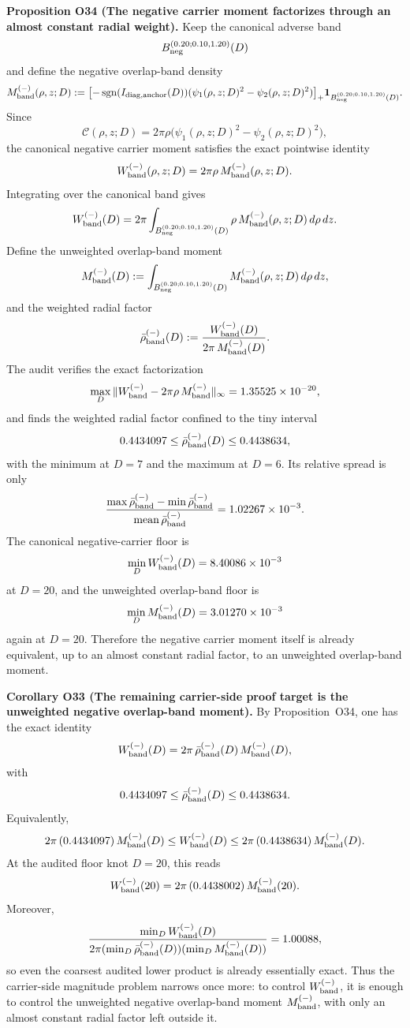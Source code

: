 \documentclass[aps,prd,onecolumn,notitlepage,nofootinbib,superscriptaddress,11pt,floatfix]{revtex4-2}
\begin{document}
\medskip\noindent\textbf{Proposition O34 (The negative carrier moment factorizes through an almost constant radial weight).}
Keep the canonical adverse band
\[
B_{\rm neg}^{(0.20;0.10,1.20)}(D)
\]
and define the negative overlap-band density
\[
M_{\rm band}^{(-)}(\rho,z;D)
:=
\bigl[-\operatorname{sgn}(I_{\rm diag,anchor}(D))(\psi_1(\rho,z;D)^2-\psi_2(\rho,z;D)^2)\bigr]_+
\mathbf 1_{B_{\rm neg}^{(0.20;0.10,1.20)}(D)}.
\]
Since
\[
\mathcal C(\rho,z;D)=2\pi\rho\bigl(\psi_1(\rho,z;D)^2-\psi_2(\rho,z;D)^2\bigr),
\]
the canonical negative carrier moment satisfies the exact pointwise identity
\[
W_{\rm band}^{(-)}(\rho,z;D)
=
2\pi\rho\,M_{\rm band}^{(-)}(\rho,z;D).
\]
Integrating over the canonical band gives
\[
W_{\rm band}^{(-)}(D)
=
2\pi\int_{B_{\rm neg}^{(0.20;0.10,1.20)}(D)} \rho\,M_{\rm band}^{(-)}(\rho,z;D)\,d\rho\,dz.
\]
Define the unweighted overlap-band moment
\[
M_{\rm band}^{(-)}(D)
:=
\int_{B_{\rm neg}^{(0.20;0.10,1.20)}(D)}
M_{\rm band}^{(-)}(\rho,z;D)\,d\rho\,dz,
\]
and the weighted radial factor
\[
\bar\rho_{\rm band}^{(-)}(D)
:=
\frac{W_{\rm band}^{(-)}(D)}{2\pi\,M_{\rm band}^{(-)}(D)}.
\]
The audit
verifies the exact factorization
\[
\max_D \|W_{\rm band}^{(-)}-2\pi\rho\,M_{\rm band}^{(-)}\|_\infty
=
1.35525\times10^{-20},
\]
and finds the weighted radial factor confined to the tiny interval
\[
0.4434097
\le
\bar\rho_{\rm band}^{(-)}(D)
\le
0.4438634,
\]
with the minimum at \(D=7\) and the maximum at \(D=6\). Its relative spread is only
\[
\frac{\max \bar\rho_{\rm band}^{(-)}-\min \bar\rho_{\rm band}^{(-)}}{\operatorname{mean}\bar\rho_{\rm band}^{(-)}}
=
1.02267\times10^{-3}.
\]
The canonical negative-carrier floor is
\[
\min_D W_{\rm band}^{(-)}(D)
=
8.40086\times10^{-3}
\]
at \(D=20\), and the unweighted overlap-band floor is
\[
\min_D M_{\rm band}^{(-)}(D)
=
3.01270\times10^{-3}
\]
again at \(D=20\). Therefore the negative carrier moment itself is already equivalent, up to an almost constant radial factor, to an unweighted overlap-band moment.

\medskip\noindent\textbf{Corollary O33 (The remaining carrier-side proof target is the unweighted negative overlap-band moment).}
By Proposition~O34, one has the exact identity
\[
W_{\rm band}^{(-)}(D)
=
2\pi\,\bar\rho_{\rm band}^{(-)}(D)\,M_{\rm band}^{(-)}(D),
\]
with
\[
0.4434097
\le
\bar\rho_{\rm band}^{(-)}(D)
\le
0.4438634.
\]
Equivalently,
\[
2\pi\,(0.4434097)\,M_{\rm band}^{(-)}(D)
\le
W_{\rm band}^{(-)}(D)
\le
2\pi\,(0.4438634)\,M_{\rm band}^{(-)}(D).
\]
At the audited floor knot \(D=20\), this reads
\[
W_{\rm band}^{(-)}(20)
=
2\pi\,(0.4438002)\,M_{\rm band}^{(-)}(20).
\]
Moreover,
\[
\frac{\min_D W_{\rm band}^{(-)}(D)}
{2\pi(\min_D \bar\rho_{\rm band}^{(-)}(D))(\min_D M_{\rm band}^{(-)}(D))}
=
1.00088,
\]
so even the coarsest audited lower product is already essentially exact. Thus the carrier-side magnitude problem narrows once more: to control \(W_{\rm band}^{(-)}\), it is enough to control the unweighted negative overlap-band moment \(M_{\rm band}^{(-)}\), with only an almost constant radial factor left outside it.
\end{document}
